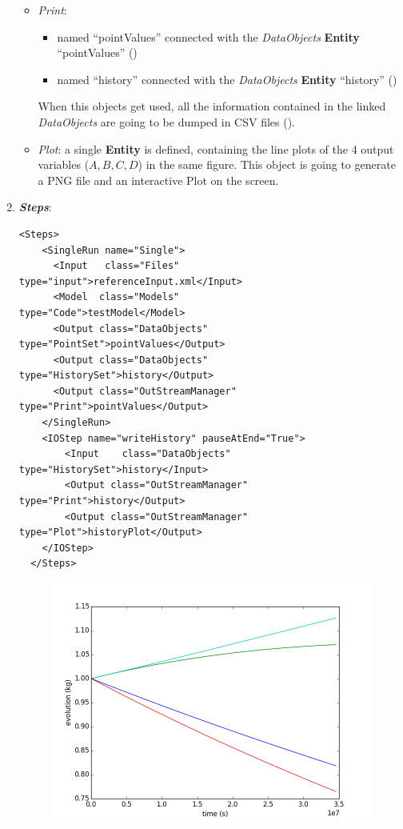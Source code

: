 \begin{enumerate}
  \begin{itemize}
    \item \textit{Print}: 
     \begin{itemize}
       \item named ``pointValues'' connected with the \textit{DataObjects} \textbf{Entity} ``pointValues'' 
                ()
       \item named ``history'' connected with the \textit{DataObjects} \textbf{Entity} ``history'' ()          
     \end{itemize}         
      When this objects get used, all the information contained in the linked  \textit{DataObjects} are going 
    to be dumped in CSV files ().
    \item \textit{Plot}: a single  \textbf{Entity} is defined, containing the line plots of the 4 output variables 
    ($A,B,C,D$) in the same figure. This object is going to generate a PNG file and an interactive Plot on 
    the screen.
  \end{itemize}   
   \item \textbf{\textit{Steps}}:   
\begin{lstlisting}[style=XML,morekeywords={arg,extension,pauseAtEnd,overwrite}]
  <Steps>
    <SingleRun name="Single">
      <Input   class="Files"                        type="input">referenceInput.xml</Input>
      <Model  class="Models"                    type="Code">testModel</Model>
      <Output class="DataObjects"            type="PointSet">pointValues</Output>
      <Output class="DataObjects"            type="HistorySet">history</Output>
      <Output class="OutStreamManager" type="Print">pointValues</Output>
    </SingleRun>
    <IOStep name="writeHistory" pauseAtEnd="True">
        <Input    class="DataObjects"            type="HistorySet">history</Input>
        <Output class="OutStreamManager" type="Print">history</Output>
        <Output class="OutStreamManager" type="Plot">historyPlot</Output>
    </IOStep>
  </Steps>
\end{lstlisting}
 \begin{figure}[h!]
  \centering
  \includegraphics[scale=0.7]{pics/1-historyPlot_line-line-line-line.png}

\end{figure}
\end{enumerate}
